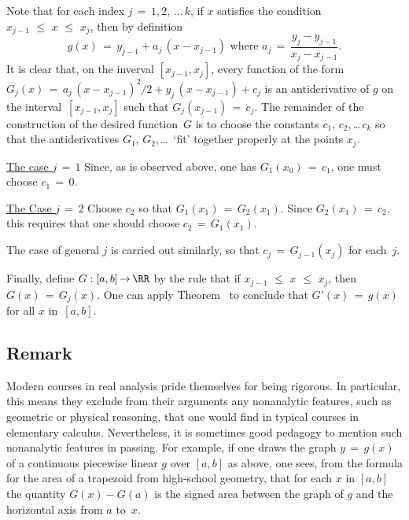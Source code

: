 {        Note that for each index $j \,=\, 1,2,\,{\ldots}\,k$, if $x$ satisfies the condition $x_{j-1}\,\,{\leq}\,\,x\,\,{\leq}\,\,x_{j}$, then by definition
        \begin{displaymath}
        g(x) \,=\, y_{j-1} + a_{j}\,(x-x_{j-1}) \mbox{ where } a_{j} \,=\, \frac{y_{j} - y_{j-1}}{x_{j} - x_{j-1}}.
        \end{displaymath}
    It is clear that, on the inverval $[x_{j-1},x_{j}]$,
    every function of the form $G_{j}(x) \,=\, a_{j}\,(x-x_{j-1})^{2}/2 + y_{j}\,(x-x_{j-1}) + c_{j}$
    is an antiderivative of $g$ on the interval~$[x_{j-1},x_{j}]$ such that $G_{j}(x_{j-1}) \,=\, c_{j}$.
    The remainder of the construction of the desired function~$G$ is to choose the constants
    $c_{1}$, $c_{2}$,\,{\ldots}\,$c_{k}$ so that the antiderivatives $G_{1}$, $G_{2}$,\,{\ldots}\, `fit' together properly at the points $x_{j}$.

        \underline{The case $j \,=\, 1$} Since, as is observed above, one has $G_{1}(x_{0}) \,=\, c_{1}$, one must choose $c_{1} \,=\, 0$.

        \underline{The Case $j \,=\, 2$} Choose $c_{2}$ so that $G_{1}(x_{1}) \,=\, G_{2}(x_{1})$.
    Since $G_{2}(x_{1}) \,=\, c_{2}$, this requires that one should choose $c_{2} \,=\, G_{1}(x_{1})$.

        The case of general $j$ is carried out similarly, so that $c_{j} \,=\, G_{j-1}(x_{j})$ for each~$j$.

        Finally, define $G:[a,b] \,{\rightarrow}\, {\RR}$ by the rule that if $x_{j-1}\,\,{\leq}\,\,x\,\,{\leq}\,\,x_{j}$, then $G(x) \,=\, G_{j}(x)$.
    One can apply Theorem~ to conclude that $G'(x) \,=\, g(x)$ for all $x$ in~$[a,b]$. \Q

\V

        \subsection{\small{\bf Remark}}
                         \label{RemrkE45.125AB}

\V

        Modern courses in real analysis pride themselves for being rigorous. In particular,
    this means they exclude from their arguments any nonanalytic features, such as geometric or physical reasoning,
    that one would find in typical courses in elementary calculus. Nevertheless, it is sometimes good pedagogy to mention such nonanalytic features in passing.
    For example, if one draws the graph $y \,=\, g(x)$ of a continuous piecewise linear $g$ over $[a,b]$ as above,
    one sees, from the formula for the area of a trapezoid from high-school geometry,
    that for each $x$ in $[a,b]$ the quantity $G(x) - G(a)$ is the signed area between the graph of $g$ and the horizontal axis from $a$ to~$x$.

}
